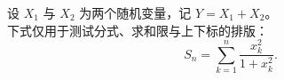 \documentclass[border=2bp]{standalone}
\begin{document}
\begin{minipage}{400bp}
\fontsize{10bp}{16bp}\selectfont
\setlength{\parindent}{0pt}
设 $X_1$ 与 $X_2$ 为两个随机变量，记 $Y=X_1+X_2$。\\
下式仅用于测试分式、求和限与上下标的排版：
\[
S_n=\sum_{k=1}^{n}\frac{x_k^2}{1+x_k^2}.
\]
\end{minipage}
\end{document}
